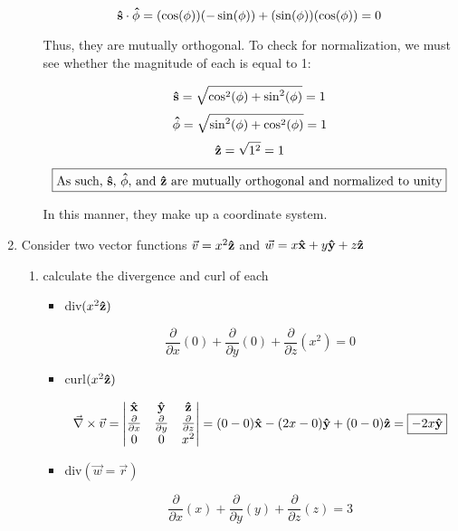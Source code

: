 \begin{enumerate}
\begin{enumerate}
            $$\bold{\hat{s}}\cdot\bold{\hat{\phi}}=(\cos(\phi))(-\sin(\phi))+(\sin(\phi))(\cos(\phi))=0$$

            Thus, they are mutually orthogonal. To check for normalization, we must see whether the magnitude of each is equal to 1:

            $$\bold{\hat{s}}=\sqrt{\cos^2(\phi)+\sin^2(\phi)}=1$$
            $$\bold{\hat{\phi}}=\sqrt{\sin^2(\phi)+\cos^2(\phi)}=1$$
            $$\bold{\hat{z}}=\sqrt{1^2}=1$$

            $$\boxed{\text{As such, $\bold{\hat{s}}$, $\bold{\hat{\phi}}$, and $\bold{\hat{z}}$ are mutually orthogonal and normalized to unity}}$$

            In this manner, they make up a coordinate system.

    \end{enumerate}

  \item Consider two vector functions $\vec{v}=x^2\bold{\hat{z}}$ and $\vec{w}=x\bold{\hat{x}}+y\bold{\hat{y}}+z\bold{\hat{z}}$

    \begin{enumerate}

      \item calculate the divergence and curl of each

        \begin{itemize}

          \item div$(x^2\bold{\hat{z}})$

            $$\boxed{\frac{\partial}{\partial x}(0)+\frac{\partial}{\partial y}(0)+\frac{\partial}{\partial z}(x^2)=0}$$

          \item curl$(x^2\bold{\hat{z}})$

            $$\vec{\nabla}\times\vec{v}=\left|\begin{matrix}\bold{\hat{x}} & \bold{\hat{y}} & \bold{\hat{z}}\\ \frac{\partial}{\partial x} & \frac{\partial}{\partial y} & \frac{\partial}{\partial z}\\ 0 & 0 & x^2\end{matrix}\right|=(0-0)\bold{\hat{x}}-(2x-0)\bold{\hat{y}}+(0-0)\bold{\hat{z}}=\boxed{-2x\bold{\hat{y}}}$$

          \item div$(\vec{w}=\vec{r})$

            $$\boxed{\frac{\partial}{\partial x}(x)+\frac{\partial}{\partial y}(y)+\frac{\partial}{\partial z}(z)=3}$$


\end{itemize}
\end{enumerate}
\end{enumerate}
